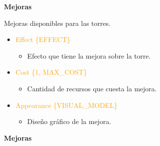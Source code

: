 \documentclass{article}
\begin{document}
\noindent \textbf{Mejoras}

\hfill \break \noindent Mejoras disponibles para las torres.

\begin{itemize}
    \item \textcolor{Orange}{Effect \{EFFECT\}}
    \begin{itemize}
        \item Efecto que tiene la mejora sobre la torre.
    \end{itemize}
    \item \textcolor{Orange}{Cost \{1, MAX\_COST\}}
    \begin{itemize}
        \item Cantidad de recursos que cuesta la mejora.
    \end{itemize}
     \item \textcolor{Orange}{Appearance \{VISUAL\_MODEL\}}
    \begin{itemize}
        \item Diseño gráfico de la mejora.
    \end{itemize}
\end{itemize}

\noindent \textbf{Mejoras}
\end{document}

